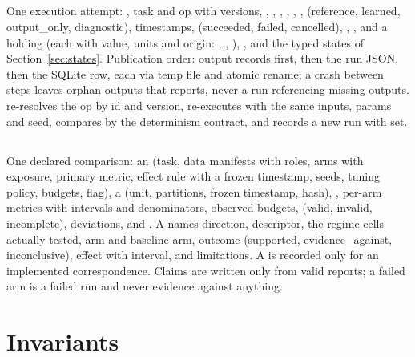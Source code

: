 \documentclass[11pt,a4paper]{article}
\begin{document}
\subsection{}
\begin{sloppypar}
One execution attempt: , task and op with versions, , , , , , ,  (reference, learned, output\_only, diagnostic), timestamps,  (succeeded, failed, cancelled), , , and a  holding  (each with value, units and origin: , , ), , and the typed states of Section~\ref{sec:states}. Publication order: output records first, then the run JSON, then the SQLite row, each via temp file and atomic rename; a crash between steps leaves orphan outputs that  reports, never a run referencing missing outputs.  re-resolves the op by id and version, re-executes with the same inputs, params and seed, compares by the determinism contract, and records a new run with  set.

\end{sloppypar}
\subsection{}
One declared comparison: an  (task, data manifests with roles, arms with exposure, primary metric, effect rule with a frozen timestamp, seeds, tuning policy, budgets,  flag), a  (unit, partitions, frozen timestamp, hash), , per-arm metrics with intervals and denominators, observed budgets,  (valid, invalid, incomplete), deviations,  and . A  names direction, descriptor, the regime cells actually tested, arm and baseline arm, outcome (supported, evidence\_against, inconclusive), effect with interval, and limitations. A  is recorded only for an implemented correspondence. Claims are written only from valid reports; a failed arm is a failed run and never evidence against anything.

\section{Invariants}
\label{sec:invariants}
\end{document}
